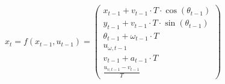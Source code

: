 \[
    x_t = f(x_{t-1}, u_{t-1}) = \begin{pmatrix}
        x_{t-1} + v_{t-1} \cdot T \cdot \cos(\theta_{t-1}) \\
        y_{t-1} + v_{t-1} \cdot T \cdot \sin(\theta_{t-1}) \\
        \theta_{t-1} + \omega_{t-1} \cdot T \\
        u_{\omega, t-1} \\
        v_{t-1} + a_{t-1} \cdot T \\
        \frac{u_{v, t-1} - v_{t-1}}{T}
    \end{pmatrix}
\]
